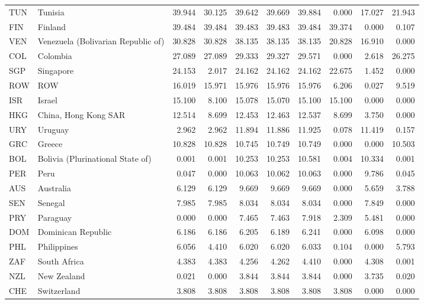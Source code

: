 \begin{table}[ht]
\begin{tabular}{llrrrrrrrr}
  TUN & Tunisia & 39.944 & 30.125 & 39.642 & 39.669 & 39.884 & 0.000 & 17.027 & 21.943 \\ 
  FIN & Finland & 39.484 & 39.484 & 39.483 & 39.483 & 39.484 & 39.374 & 0.000 & 0.107 \\ 
  VEN & Venezuela (Bolivarian Republic of) & 30.828 & 30.828 & 38.135 & 38.135 & 38.135 & 20.828 & 16.910 & 0.000 \\ 
  COL & Colombia & 27.089 & 27.089 & 29.333 & 29.327 & 29.571 & 0.000 & 2.618 & 26.275 \\ 
  SGP & Singapore & 24.153 & 2.017 & 24.162 & 24.162 & 24.162 & 22.675 & 1.452 & 0.000 \\ 
  ROW & ROW & 16.019 & 15.971 & 15.976 & 15.976 & 15.976 & 6.206 & 0.027 & 9.519 \\ 
  ISR & Israel & 15.100 & 8.100 & 15.078 & 15.070 & 15.100 & 15.100 & 0.000 & 0.000 \\ 
  HKG & China, Hong Kong SAR & 12.514 & 8.699 & 12.453 & 12.463 & 12.537 & 8.699 & 3.750 & 0.000 \\ 
  URY & Uruguay & 2.962 & 2.962 & 11.894 & 11.886 & 11.925 & 0.078 & 11.419 & 0.157 \\ 
  GRC & Greece & 10.828 & 10.828 & 10.745 & 10.749 & 10.749 & 0.000 & 0.000 & 10.503 \\ 
  BOL & Bolivia (Plurinational State of) & 0.001 & 0.001 & 10.253 & 10.253 & 10.581 & 0.004 & 10.334 & 0.001 \\ 
  PER & Peru & 0.047 & 0.000 & 10.063 & 10.062 & 10.063 & 0.000 & 9.786 & 0.045 \\ 
  AUS & Australia & 6.129 & 6.129 & 9.669 & 9.669 & 9.669 & 0.000 & 5.659 & 3.788 \\ 
  SEN & Senegal & 7.985 & 7.985 & 8.034 & 8.034 & 8.034 & 0.000 & 7.849 & 0.000 \\ 
  PRY & Paraguay & 0.000 & 0.000 & 7.465 & 7.463 & 7.918 & 2.309 & 5.481 & 0.000 \\ 
  DOM & Dominican Republic & 6.186 & 6.186 & 6.205 & 6.189 & 6.241 & 0.000 & 6.098 & 0.000 \\ 
  PHL & Philippines & 6.056 & 4.410 & 6.020 & 6.020 & 6.033 & 0.104 & 0.000 & 5.793 \\ 
  ZAF & South Africa & 4.383 & 4.383 & 4.256 & 4.262 & 4.410 & 0.000 & 4.308 & 0.001 \\ 
  NZL & New Zealand & 0.021 & 0.000 & 3.844 & 3.844 & 3.844 & 0.000 & 3.735 & 0.020 \\ 
  CHE & Switzerland & 3.808 & 3.808 & 3.808 & 3.808 & 3.808 & 3.808 & 0.000 & 0.000 \\ 

\end{tabular}
\end{table}
